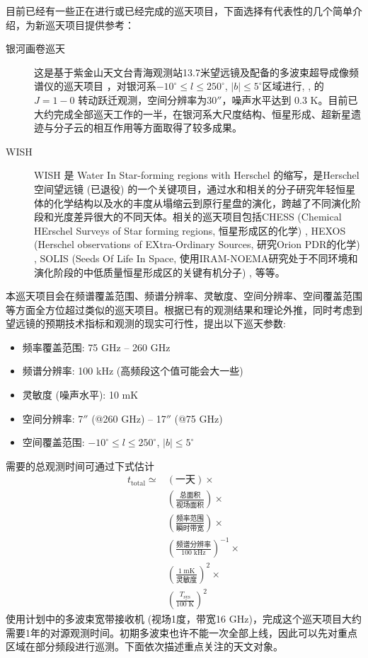 \documentclass[a4paper]{article}
\newcommand\Hii{H\;\textsc{ii}}
\begin{document}
目前已经有一些正在进行或已经完成的巡天项目，下面选择有代表性的几个简单介绍，为新巡天项目提供参考：
\begin{description}
  \item[银河画卷巡天] 这是基于紫金山天文台青海观测站13.7米望远镜及配备的多波束超导成像频谱仪的巡天项目 \citep{Lu2018}，对银河系$-10^\circ\le l\le 250^\circ$, $|b|\le5^\circ$区域进行, , 的 $J=1{-}0$ 转动跃迁观测，空间分辨率为$30''$，噪声水平达到 0.3 K。目前已大约完成全部巡天工作的一半，在银河系大尺度结构、恒星形成、超新星遗迹与分子云的相互作用等方面取得了较多成果。
  \item[WISH] WISH 是 Water In Star-forming regions with Herschel 的缩写，是Herschel空间望远镜 (已退役) 的一个关键项目，通过水和相关的分子研究年轻恒星体的化学结构以及水的丰度从塌缩云到原行星盘的演化，跨越了不同演化阶段和光度差异很大的不同天体。相关的巡天项目包括CHESS (Chemical HErschel Surveys of Star forming regions, 恒星形成区的化学) \citep{Ceccarelli2010}, HEXOS (Herschel observations of EXtra-Ordinary Sources, 研究Orion PDR的化学) \citep{Bergin2010}, SOLIS (Seeds Of Life In Space, 使用IRAM-NOEMA研究处于不同环境和演化阶段的中低质量恒星形成区的关键有机分子) \citep{Ceccarelli2017}, 等等。
\end{description}  
本巡天项目会在频谱覆盖范围、频谱分辨率、灵敏度、空间分辨率、空间覆盖范围等方面全方位超过类似的巡天项目。根据已有的观测结果和理论外推，同时考虑到望远镜的预期技术指标和观测的现实可行性，提出以下巡天参数:
\begin{itemize}
  \item 频率覆盖范围: 75 GHz -- 260 GHz
  \item 频谱分辨率: 100 kHz (高频段这个值可能会大一些)
  \item 灵敏度 (噪声水平): 10 mK
  \item 空间分辨率: 7$''$ (@260 GHz) -- 17$''$ (@75 GHz)
  \item 空间覆盖范围: $-10^\circ\le l\le 250^\circ$, $|b|\le5^\circ$
\end{itemize}  
需要的总观测时间可通过下式估计
\begin{equation}
\begin{split}
  t_\text{total} \simeq
  & \left(\text{一天}\right) \times\\
  & \left(\frac{\text{总面积}}{\text{视场面积}}\right)\times \\
  & \left(\frac{\text{频率范围}}{\text{瞬时带宽}}\right)\times \\
  & \left(\frac{\text{频谱分辨率}}{100\;\text{kHz}}\right)^{-1}\times \\
  & \left(\frac{1\;\text{mK}}{\text{灵敏度}}\right)^2\times \\
  & \left(\frac{T_\text{sys}}{100\;\text{K}}\right)^2
\end{split} 
\end{equation} 
使用计划中的多波束宽带接收机 (视场1度，带宽16 GHz)，完成这个巡天项目大约需要1年的对源观测时间。初期多波束也许不能一次全部上线，因此可以先对重点区域在部分频段进行巡测。下面依次描述重点关注的天文对象。
\end{document}

